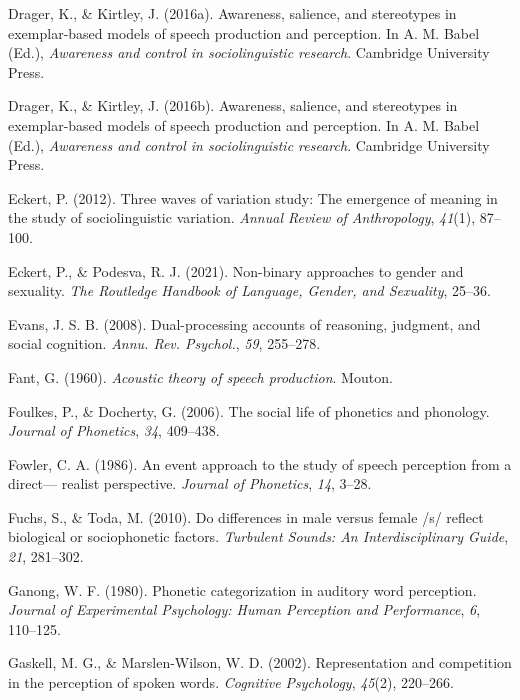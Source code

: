 \documentclass[
  letterpaper,
  DIV=11,
  numbers=noendperiod]{scrartcl}
\newlength{\cslhangindent}
\newenvironment{CSLReferences}[2] %
 {\begin{list}{}{%
  \setlength{\itemindent}{0pt}
  \setlength{\leftmargin}{0pt}
  \setlength{\parsep}{0pt}
  \ifodd #1
   \setlength{\leftmargin}{\cslhangindent}
   \setlength{\itemindent}{-1\cslhangindent}
  \fi
  \setlength{\itemsep}{#2\baselineskip}}}
 {\end{list}}
\begin{document}
\begin{CSLReferences}{1}{0}
Drager, K., \& Kirtley, J. (2016a). Awareness, salience, and stereotypes
in exemplar-based models of speech production and perception. In A. M.
Babel (Ed.), \emph{Awareness and control in sociolinguistic research}.
Cambridge University Press.

Drager, K., \& Kirtley, J. (2016b). Awareness, salience, and stereotypes
in exemplar-based models of speech production and perception. In A. M.
Babel (Ed.), \emph{Awareness and control in sociolinguistic research}.
Cambridge University Press.

Eckert, P. (2012). Three waves of variation study: {The} emergence of
meaning in the study of sociolinguistic variation. \emph{Annual Review
of Anthropology}, \emph{41}(1), 87--100.

Eckert, P., \& Podesva, R. J. (2021). Non-binary approaches to gender
and sexuality. \emph{The Routledge Handbook of Language, Gender, and
Sexuality}, 25--36.

Evans, J. S. B. (2008). Dual-processing accounts of reasoning, judgment,
and social cognition. \emph{Annu. Rev. Psychol.}, \emph{59}, 255--278.

Fant, G. (1960). \emph{Acoustic theory of speech production}. Mouton.

Foulkes, P., \& Docherty, G. (2006). The social life of phonetics and
phonology. \emph{Journal of Phonetics}, \emph{34}, 409--438.

Fowler, C. A. (1986). An event approach to the study of speech
perception from a direct--- realist perspective. \emph{Journal of
Phonetics}, \emph{14}, 3--28.

Fuchs, S., \& Toda, M. (2010). Do differences in male versus female /s/
reflect biological or sociophonetic factors. \emph{Turbulent Sounds: An
Interdisciplinary Guide}, \emph{21}, 281--302.

Ganong, W. F. (1980). Phonetic categorization in auditory word
perception. \emph{Journal of Experimental Psychology: Human Perception
and Performance}, \emph{6}, 110--125.

Gaskell, M. G., \& Marslen-Wilson, W. D. (2002). Representation and
competition in the perception of spoken words. \emph{Cognitive
Psychology}, \emph{45}(2), 220--266.


\end{CSLReferences}
\end{document}
